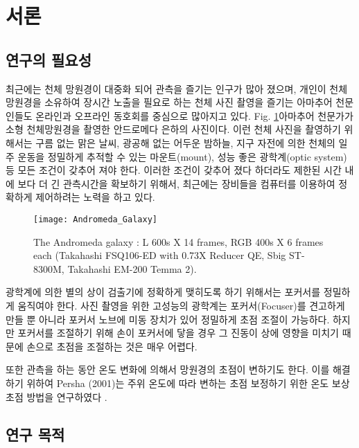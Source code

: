 \section{서론}

\subsection{연구의 필요성}

최근에는 천체 망원경이 대중화 되어 관측을 즐기는 인구가 많아 졌으며, 개인이 천체 망원경을 소유하여 장시간 노출을 필요로 하는 천체 사진 촬영을 즐기는 아마추어 천문인들도 온라인과 오프라인 동호회를 중심으로 많아지고 있다. Fig. \ref{fig:The_Andromeda_Galaxy}\은 아마추어 천문가가 소형 천체망원경을 촬영한 안드로메다 은하의 사진이다. 이런 천체 사진을 촬영하기 위해서는 구름 없는 맑은 날씨, 광공해 없는 어두운 밤하늘, 지구 자전에 의한 천체의 일주 운동을 정밀하게 추적할 수 있는 마운트(mount), 성능 좋은 광학계(optic system) 등 모든 조건이 갖추어 져야 한다. 이러한 조건이 갖추어 졌다 하더라도 제한된 시간 내에 보다 더 긴 관측시간을 확보하기 위해서, 최근에는 장비들을 컴퓨터를 이용하여 정확하게 제어하려는 노력을 하고 있다. 

\begin{figure}[H]
	\begin{center}
		\texttt{[image: Andromeda\_Galaxy]}
		\caption{The Andromeda galaxy : L 600s X 14 frames, RGB 400s X 6 frames each (Takahashi FSQ106-ED with 0.73X Reducer QE, Sbig ST-8300M, Takahashi EM-200 Temma 2).}
		\label{fig:The_Andromeda_Galaxy}
	\end{center}
\end{figure}

광학계에 의한 별의 상이 검출기에 정확하게 맺히도록 하기 위해서는 포커서를 정밀하게 움직여야 한다. 사진 촬영을 위한 고성능의 광학계는 포커서(Focuser)를 견고하게 만들 뿐 아니라 포커서 노브에 미동 장치가 있어 정밀하게 초점 조절이 가능하다. 하지만 포커서를 조절하기 위해 손이 포커서에 닿을 경우 그 진동이 상에 영향을 미치기 때문에 손으로 초점을 조절하는 것은 매우 어렵다. 

또한 관측을 하는 동안 온도 변화에 의해서 망원경의 초점이 변하기도 한다. 이를 해결하기 위하여 Persha (2001)는 주위 온도에 따라 변하는 초점 보정하기 위한 온도 보상 초점 방법을 연구하였다 \cite{persha2001temperature}.


\subsection{연구 목적}

